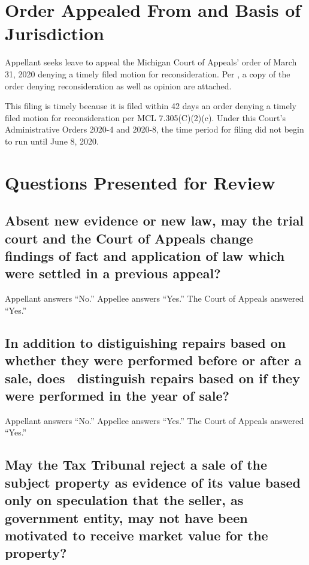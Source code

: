 \documentclass[12pt,\documentclassflag]{michiganCourtOfAppealsBrief}
\begin{document}
\section{Order Appealed From and Basis of Jurisdiction}

Appellant seeks leave to appeal the Michigan Court of Appeals' order of March 31, 2020
denying a timely filed motion for reconsideration.
Per \cite{MCR 7.305(A)(2)}, a copy of the order denying reconsideration as well as opinion are attached.

This filing is timely because it is filed within 42 days an order denying a timely filed motion for reconsideration per MCL 7.305(C)(2)(c). Under this Court's Administrative Orders 2020-4 and 2020-8, the time period for filing did not begin to run until June 8, 2020.


\newpage
\section{Questions Presented for Review}

\subsection{Absent new evidence or new law, may the trial court and the Court of Appeals change findings of fact and application of law which were settled in a previous appeal?}

\noindent Appellant answers ``No.'' Appellee answers ``Yes.'' The Court of Appeals answered ``Yes.''

\subsection{In addition to distiguishing repairs based on whether they were performed before or after a sale, does \mathieuGast\ distinguish repairs based on if they were performed in the year of sale?}

\noindent Appellant answers ``No.'' Appellee answers ``Yes.'' The Court of Appeals answered ``Yes.''

\subsection{May the Tax Tribunal reject a sale of the subject property as evidence of its value based only on speculation that the seller, as government entity, may not have been motivated to receive market value for the property?}
\end{document}
